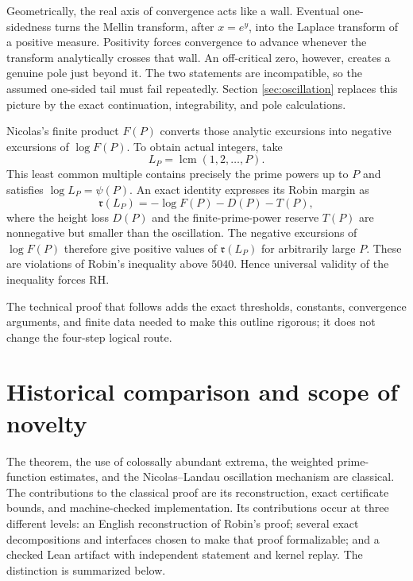 \documentclass[11pt]{amsart}
\theoremstyle{definition}
\theoremstyle{remark}
\numberwithin{equation}{section}
\newcommand{\RH}{\mathrm{RH}}
\newcommand{\M}{\mathfrak r}
\begin{document}
Geometrically, the real axis of convergence acts like a wall.  Eventual
one-sidedness turns the Mellin transform, after $x=e^y$, into the Laplace
transform of a positive measure.  Positivity forces convergence to advance
whenever the transform analytically crosses that wall.  An off-critical zero,
however, creates a genuine pole just beyond it.  The two statements are
incompatible, so the assumed one-sided tail must fail repeatedly.  Section
\ref{sec:oscillation} replaces this picture by the exact continuation,
integrability, and pole calculations.

Nicolas's finite product $F(P)$ converts those analytic excursions into
negative excursions of $\log F(P)$.  To obtain actual integers, take
\[
 L_P=\operatorname{lcm}(1,2,\ldots,P).
\]
This least common multiple contains precisely the prime powers up to $P$ and
satisfies $\log L_P=\psi(P)$.  An exact identity expresses its Robin margin
as
\[
 \M(L_P)=-\log F(P)-D(P)-T(P),
\]
where the height loss $D(P)$ and the finite-prime-power reserve $T(P)$ are
nonnegative but smaller than the oscillation.  The negative excursions of
$\log F(P)$ therefore give positive values of $\M(L_P)$ for arbitrarily
large $P$.  These are violations of Robin's inequality above $5040$.
Hence universal validity of the inequality forces $\RH$.

The technical proof that follows adds the exact thresholds, constants,
convergence arguments, and finite data needed to make this outline rigorous;
it does not change the four-step logical route.

\section{Historical comparison and scope of novelty}\label{sec:comparison}

The theorem, the use of colossally abundant extrema, the weighted
prime-function estimates, and the Nicolas--Landau oscillation mechanism are
classical.  The contributions to the classical proof are its reconstruction,
exact certificate bounds, and machine-checked implementation.  Its contributions occur at
three different levels: an English reconstruction of Robin's proof; several
exact decompositions and interfaces chosen to make that proof formalizable;
and a checked Lean artifact with independent statement and kernel replay.
The distinction is summarized below.
\end{document}

